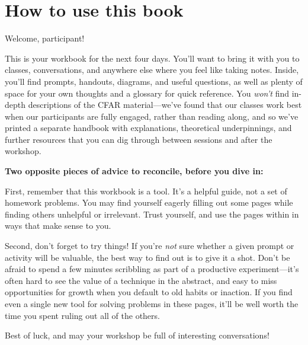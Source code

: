 \clearpage
\chapter*{How to use this book}
Welcome, participant!

This is your workbook for the next four days.  You'll want to bring it with you to classes, conversations, and anywhere else where you feel like taking notes.  Inside, you'll find prompts, handouts, diagrams, and useful questions, as well as plenty of space for your own thoughts and a glossary for quick reference.  You \emph{won't} find in-depth descriptions of the CFAR material---we've found that our classes work best when our participants are fully engaged, rather than reading along, and so we've printed a separate handbook with explanations, theoretical underpinnings, and further resources that you can dig through between sessions and after the workshop.

\textbf{Two opposite pieces of advice to reconcile, before you dive in:}

First, remember that this workbook is a tool.  It's a helpful guide, not a set of homework problems.  You may find yourself eagerly filling out some pages while finding others unhelpful or irrelevant.  Trust yourself, and use the pages within in ways that make sense to you.

Second, don't forget to try things!  If you're \emph{not} sure whether a given prompt or activity will be valuable, the best way to find out is to give it a shot.  Don't be afraid to spend a few minutes scribbling as part of a productive experiment---it's often hard to see the value of a technique in the abstract, and easy to miss opportunities for growth when you default to old habits or inaction.  If you find even a single new tool for solving problems in these pages, it'll be well worth the time you spent ruling out all of the others.

Best of luck, and may your workshop be full of interesting conversations!
\clearpage



